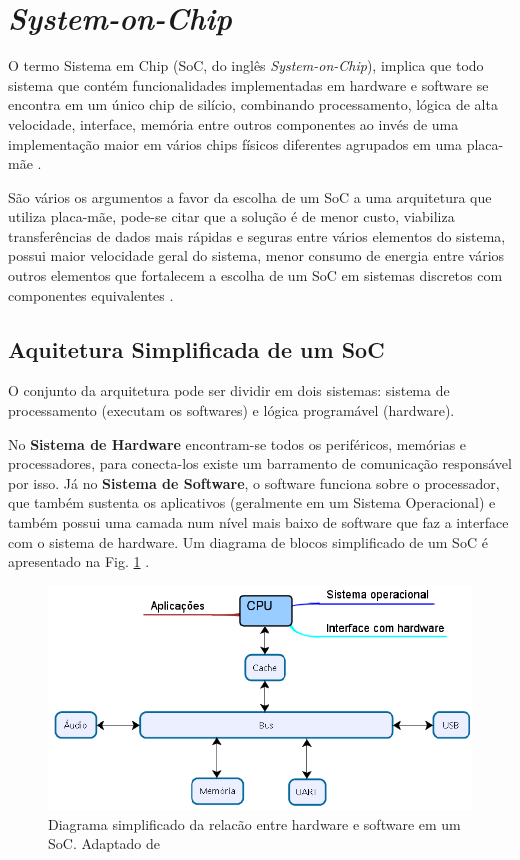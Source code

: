 \section{\textit{System-on-Chip}}

O termo Sistema em Chip (SoC, do inglês \textit{System-on-Chip}), implica que todo sistema que contém funcionalidades implementadas em hardware e software se encontra em um único chip de silício, combinando processamento, lógica de alta velocidade, interface, memória entre outros componentes ao invés de uma implementação maior em vários chips físicos diferentes agrupados em uma placa-mãe \cite{zynqBook}.

São vários os argumentos a favor da escolha de um SoC a uma arquitetura que utiliza placa-mãe, pode-se citar que a solução é de menor custo, viabiliza transferências de dados mais rápidas e seguras entre vários elementos do sistema, possui maior velocidade geral do sistema, menor consumo de energia entre vários outros elementos que fortalecem a escolha de um SoC em sistemas discretos com componentes equivalentes \cite{zynqBook}.

\subsection{Aquitetura Simplificada de um SoC}

O conjunto da arquitetura pode ser dividir em dois sistemas: sistema de processamento (executam os softwares) e lógica programável (hardware). 

No \textbf{Sistema de Hardware} encontram-se todos os periféricos, memórias e processadores, para conecta-los existe um barramento de comunicação responsável por isso. Já no \textbf{Sistema de Software}, o software funciona sobre o processador, que também sustenta os aplicativos (geralmente em um Sistema Operacional)  e também possui uma camada num nível mais baixo de software que 
faz a interface com o sistema de hardware. Um diagrama de blocos simplificado de um SoC é apresentado na Fig. \ref{diagram SoC} \cite{zynqBook}.


\begin{figure}[h]
	\centering
	\includegraphics[keepaspectratio=true,scale=0.5]{figuras/diaagrama-soc.png}
	\caption{Diagrama simplificado da relacão entre hardware e software em um SoC. Adaptado de \cite{cao2017post}}
	\label{diagram SoC}
\end{figure}


